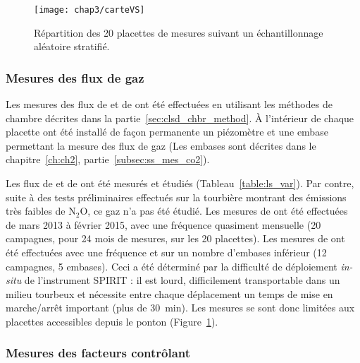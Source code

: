 \begin{figure}
\centering
\texttt{[image: chap3/carteVS]}
\caption{Répartition des 20 placettes de mesures suivant un échantillonnage aléatoire stratifié.}
\label{fig:carteVS}
\end{figure}

\subsubsection{Mesures des flux de gaz}

Les mesures des flux de \coo et de \chh ont été effectuées en utilisant les méthodes de chambre décrites dans la partie~\ref{sec:clsd_chbr_method}.
À l'intérieur de chaque placette ont été installé de façon permanente un piézomètre et une embase permettant la mesure des flux de gaz (Les embases sont décrites dans le chapitre~\ref{ch:ch2}, partie~\ref{subsec:ss_mes_co2}).


Les flux de \coo et de \chh ont été mesurés et étudiés (Tableau~\ref{table:ls_var}).
Par contre, suite à des tests préliminaires effectués sur la tourbière montrant des émissions très faibles de N$_{2}$O, ce gaz n'a pas été étudié.
Les mesures de \coo ont été effectuées de mars 2013 à février 2015, avec une fréquence quasiment mensuelle (20 campagnes, pour 24 mois de mesures, sur les 20 placettes). Les mesures de \chh ont été effectuées avec une fréquence et sur un nombre d'embases inférieur (12 campagnes, 5 embases).
Ceci a été déterminé par la difficulté de déploiement \textit{in-situ} de l'instrument SPIRIT : il est lourd, difficilement transportable dans un milieu tourbeux et nécessite entre chaque déplacement un temps de mise en marche/arrêt important (plus de \SI{30}{\minute}).
Les mesures se sont donc limitées aux placettes accessibles depuis le ponton (Figure~\ref{fig:carteVS}).

\subsubsection{Mesures des facteurs contrôlant}


